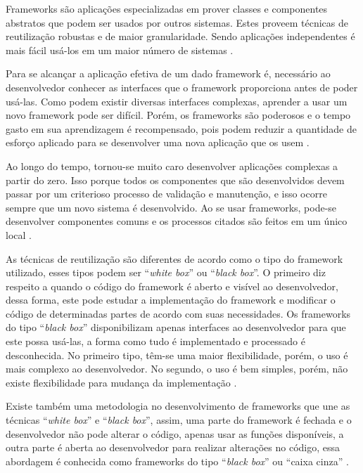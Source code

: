 Frameworks são aplicações especializadas em prover classes e componentes abstratos que podem ser usados por outros sistemas. Estes proveem técnicas de reutilização robustas e de maior granularidade. Sendo aplicações independentes é mais fácil usá-los em um maior número de sistemas \cite{Johnson:Foote:1988}.

Para se alcançar a aplicação efetiva de um dado framework é, necessário ao desenvolvedor conhecer as interfaces que o framework proporciona antes de poder usá-las. Como podem existir diversas interfaces complexas, aprender a usar um novo framework pode ser difícil. Porém, os frameworks são poderosos e o tempo gasto em sua aprendizagem é recompensado, pois podem reduzir a quantidade de esforço aplicado para se desenvolver uma nova aplicação que os usem \cite{Johnson:1997}.

Ao longo do tempo, tornou-se muito caro desenvolver aplicações complexas a partir do zero. Isso porque todos os componentes que são desenvolvidos devem passar por um criterioso processo de validação e manutenção, e isso ocorre sempre que um novo sistema é desenvolvido. Ao se usar frameworks, pode-se desenvolver componentes comuns e os processos citados são feitos em um único local \cite{Fayad:Schimidt:1997}.

As técnicas de reutilização são diferentes de acordo como o tipo do framework utilizado, esses tipos podem ser ``\textit{white box}'' ou ``\textit{black box}''. O primeiro diz respeito a quando o código do framework é aberto e visível ao desenvolvedor, dessa forma, este pode estudar a implementação do framework e modificar o código de determinadas partes de acordo com suas necessidades. Os frameworks do tipo ``\textit{black box}'' disponibilizam apenas interfaces ao desenvolvedor para que este possa usá-las, a forma como tudo é implementado e processado é desconhecida. No primeiro tipo, têm-se uma maior flexibilidade, porém, o uso é mais complexo ao desenvolvedor. No segundo, o uso é bem simples, porém, não existe flexibilidade para mudança da implementação \cite{Kroth:2000}.

Existe também uma metodologia no desenvolvimento de frameworks que une as técnicas ``\textit{white box}'' e ``\textit{black box}'', assim, uma parte do framework é fechada e o desenvolvedor não pode alterar o código, apenas usar as funções disponíveis, a outra parte é aberta ao desenvolvedor para realizar alterações no código, essa abordagem é conhecida como frameworks do tipo ``\textit{black box}'' ou ``caixa cinza'' \cite{Kristensen:2004}.

